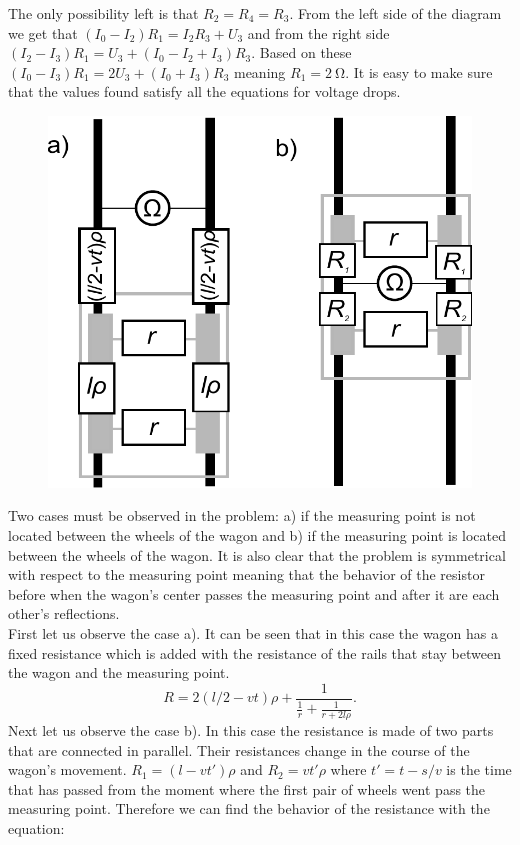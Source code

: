 \documentclass[11pt]{article}
\begin{document}
The only possibility left is that $R_2=R_4=R_3$. From the left side of the diagram we get that $(I_0-I_2)R_1=I_2R_3+U_3$ and from the right side $(I_2-I_3)R_1=U_3+(I_0-I_2+I_3)R_3$. Based on these $(I_0-I_3)R_1=2U_3+(I_0+I_3)R_3$ meaning $R_1=\SI{2}{\ohm}$. It is easy to make sure that the values found satisfy all the equations for voltage drops.
\probend
\bigskip


\solueng
\begin{figure}
\includegraphics[width=\linewidth]{2012-v2g-08-rong_lahendus}
\end{figure}
Two cases must be observed in the problem: a) if the measuring point is not located between the wheels of the wagon and b) if the measuring point is located between the wheels of the wagon. It is also clear that the problem is symmetrical with respect to the measuring point meaning that the behavior of the resistor before when the wagon’s center passes the measuring point and after it are each other’s reflections.\\
First let us observe the case a). It can be seen that in this case the wagon has a fixed resistance which is added with the resistance of the rails that stay between the wagon and the measuring point. 
\[
R=2(l/2-vt)\rho+\frac{1}{\frac{1}{r}+\frac{1}{r+2l\rho}}.
\] 
Next let us observe the case b). In this case the resistance is made of two parts that are connected in parallel. Their resistances change in the course of the wagon’s movement. $R_1=(l-vt')\rho$ and $R_2=vt'\rho$ where $t'=t-s/v$ is the time that has passed from the moment where the first pair of wheels went pass the measuring point. Therefore we can find the behavior of the resistance with the equation:
\end{document}
